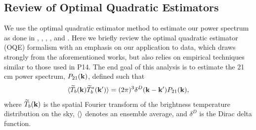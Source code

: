 \documentclass[twocolumn,numberedappendix]{emulateapj} \shorttitle{New Limits on the 21 cm Power Spectrum at $z=8.4$}
\begin{document}
%
%
\subsection{Review of Optimal Quadratic Estimators}
We use the optimal quadratic estimator method to estimate our power spectrum as
done in \citet{liu_tegmark2011}, \citet{dillon_et_al2013a}, \citet{liu_et_al2014a}, \citet{liu_et_al2014b}, and \citet{trott_et_al2012}.  Here we briefly review the
optimal quadratic estimator (OQE) formalism with an emphasis on our application
to data, which draws strongly from the aforementioned works, but also relies on empirical
techniques similar to those used in P14. The end goal of this analysis is to estimate the 21 cm
power spectrum, $P_{21}(\mathbf{k})$, defined such that 
\begin{equation}
\label{eqn:pspec_def}
    \expval{\widetilde{T}_{b}(\k)\widetilde{T}^{*}_{b}(\k^{\prime})} =
            (2\pi)^{3}\delta^{D}(\k - \k^{\prime})P_{21}(\k),
\end{equation}
where $\widetilde{T}_{b}(\mathbf{k})$ is the spatial Fourier transform of the brightness temperature
distribution on the sky, $\langle  \rangle$ denotes an ensemble average, and
$\delta^{D}$ is the Dirac delta function. 
\end{document}
